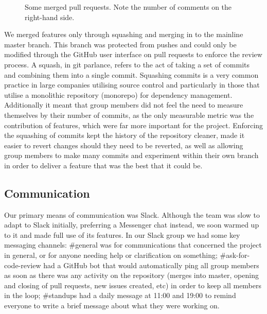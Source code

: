 \begin{figure}[H]
\centering
{}
\caption{Some merged pull requests. Note the number of comments on the right-hand side.}
\label{pr}
\end{figure}

We merged features only through squashing and merging in to the mainline master branch. This branch was protected from pushes and could only be modified through the GitHub user interface on pull requests to enforce the review process. A squash, in git parlance, refers to the act of taking a set of commits and combining them into a single commit. Squashing commits is a very common practice in large companies utilising source control and particularly in those that utilise a monolithic repository (monorepo) for dependency management. Additionally it meant that group members did not feel the need to measure themselves by their number of commits, as the only measurable metric was the contribution of features, which were far more important for the project. Enforcing the squashing of commits kept the history of the repository cleaner, made it easier to revert changes should they need to be reverted, as well as allowing group members to make many commits and experiment within their own branch in order to deliver a feature that was the best that it could be.

\subsection{Communication}

Our primary means of communication was Slack. Although the team was slow to adapt to Slack initially, preferring a Messenger chat instead, we soon warmed up to it and made full use of its features. In our Slack group we had some key messaging channels: \#general was for communications that concerned the project in general, or for anyone needing help or clarification on something; \#ask-for-code-review had a GitHub bot that would automatically ping all group members as soon as there was any activity on the repository (merges into master, opening and closing of pull requests, new issues created, etc) in order to keep all members in the loop; \#standups had a daily message at 11:00 and 19:00 to remind everyone to write a brief message about what they were working on.

